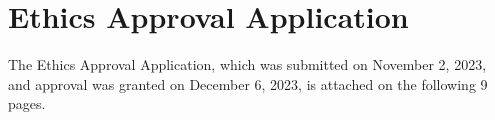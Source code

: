 \newpage
\section{\label{sec:ethics-approval-application}Ethics Approval Application}
The Ethics Approval Application, which was submitted on November 2, 2023, and approval was granted on December 6, 2023, is attached on the following 9 pages.
